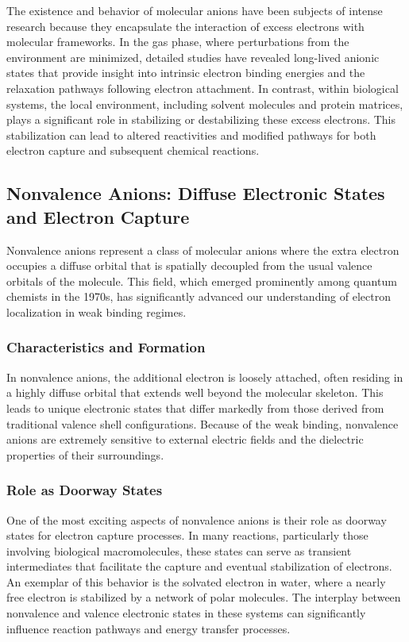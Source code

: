 The existence and behavior of molecular anions have been subjects of intense research because they encapsulate the interaction of excess electrons with molecular frameworks. In the gas phase, where perturbations from the environment are minimized, detailed studies have revealed long-lived anionic states that provide insight into intrinsic electron binding energies and the relaxation pathways following electron attachment. In contrast, within biological systems, the local environment, including solvent molecules and protein matrices, plays a significant role in stabilizing or destabilizing these excess electrons. This stabilization can lead to altered reactivities and modified pathways for both electron capture and subsequent chemical reactions.

\subsection{Nonvalence Anions: Diffuse Electronic States and Electron Capture}

Nonvalence anions represent a class of molecular anions where the extra electron occupies a diffuse orbital that is spatially decoupled from the usual valence orbitals of the molecule. This field, which emerged prominently among quantum chemists in the 1970s, has significantly advanced our understanding of electron localization in weak binding regimes.

\subsubsection{Characteristics and Formation}

In nonvalence anions, the additional electron is loosely attached, often residing in a highly diffuse orbital that extends well beyond the molecular skeleton. This leads to unique electronic states that differ markedly from those derived from traditional valence shell configurations. Because of the weak binding, nonvalence anions are extremely sensitive to external electric fields and the dielectric properties of their surroundings. 

\subsubsection{Role as Doorway States}

One of the most exciting aspects of nonvalence anions is their role as doorway states for electron capture processes. In many reactions, particularly those involving biological macromolecules, these states can serve as transient intermediates that facilitate the capture and eventual stabilization of electrons. An exemplar of this behavior is the solvated electron in water, where a nearly free electron is stabilized by a network of polar molecules. The interplay between nonvalence and valence electronic states in these systems can significantly influence reaction pathways and energy transfer processes.


